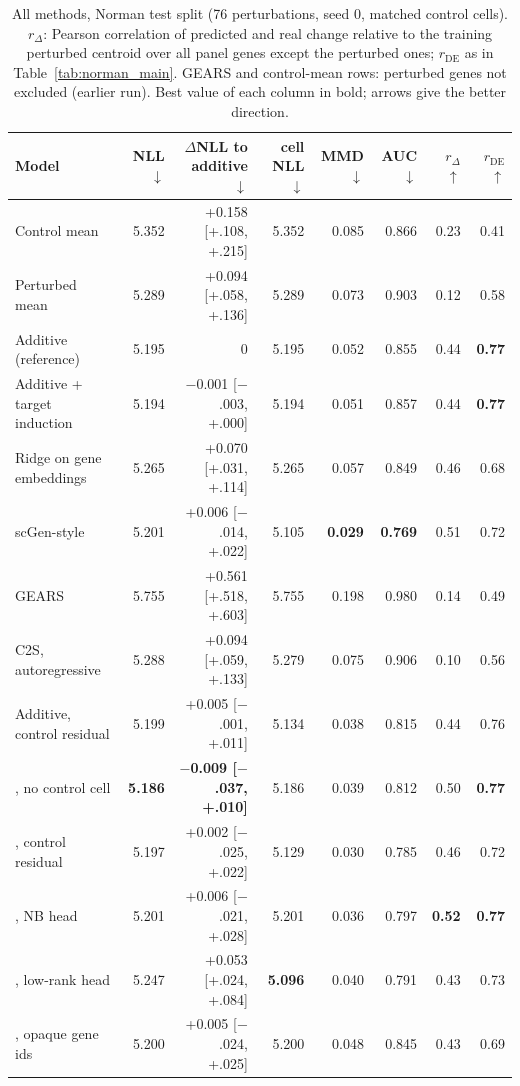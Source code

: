 \begin{table}[!htb]
\centering
\small
\setlength{\tabcolsep}{3pt}
\begin{tabular}{lrrrrrrr}
\toprule
Model & NLL $\downarrow$ & $\Delta$NLL to additive $\downarrow$ & cell NLL $\downarrow$ & MMD $\downarrow$ & AUC $\downarrow$ & $r_\Delta$ $\uparrow$ & $r_{\mathrm{DE}}$ $\uparrow$ \\
\midrule
Control mean & 5.352 & +0.158 [+.108, +.215] & 5.352 & 0.085 & 0.866 & 0.23 & 0.41 \\
Perturbed mean & 5.289 & +0.094 [+.058, +.136] & 5.289 & 0.073 & 0.903 & 0.12 & 0.58 \\
Additive (reference) & 5.195 & 0 & 5.195 & 0.052 & 0.855 & 0.44 & \textbf{0.77} \\
Additive + target induction & 5.194 & $-$0.001 [$-$.003, +.000] & 5.194 & 0.051 & 0.857 & 0.44 & \textbf{0.77} \\
Ridge on gene embeddings & 5.265 & +0.070 [+.031, +.114] & 5.265 & 0.057 & 0.849 & 0.46 & 0.68 \\
scGen-style & 5.201 & +0.006 [$-$.014, +.022] & 5.105 & \textbf{0.029} & \textbf{0.769} & 0.51 & 0.72 \\
GEARS & 5.755 & +0.561 [+.518, +.603] & 5.755 & 0.198 & 0.980 & 0.14 & 0.49 \\
C2S, autoregressive & 5.288 & +0.094 [+.059, +.133] & 5.279 & 0.075 & 0.906 & 0.10 & 0.56 \\
Additive, control residual & 5.199 & +0.005 [$-$.001, +.011] & 5.134 & 0.038 & 0.815 & 0.44 & 0.76 \\
\rowcolor{ours}\cad{}, no control cell & \textbf{5.186} & \textbf{$-$0.009 [$-$.037, +.010]} & 5.186 & 0.039 & 0.812 & 0.50 & \textbf{0.77} \\
\rowcolor{ours}\cad{}, control residual & 5.197 & +0.002 [$-$.025, +.022] & 5.129 & 0.030 & 0.785 & 0.46 & 0.72 \\
\rowcolor{ours}\cad{}, NB head & 5.201 & +0.006 [$-$.021, +.028] & 5.201 & 0.036 & 0.797 & \textbf{0.52} & \textbf{0.77} \\
\rowcolor{ours}\cad{}, low-rank head & 5.247 & +0.053 [+.024, +.084] & \textbf{5.096} & 0.040 & 0.791 & 0.43 & 0.73 \\
\rowcolor{ours}\cad{}, opaque gene ids & 5.200 & +0.005 [$-$.024, +.025] & 5.200 & 0.048 & 0.845 & 0.43 & 0.69 \\
\bottomrule
\end{tabular}
\caption{All methods, Norman test split (76 perturbations, seed 0, matched control cells). $r_\Delta$: Pearson correlation of predicted and real change relative to the training perturbed centroid over all panel genes except the perturbed ones; $r_{\mathrm{DE}}$ as in Table~\ref{tab:norman_main}. GEARS and control-mean rows: perturbed genes not excluded (earlier run). Best value of each column in bold; arrows give the better direction.}
\label{tab:norman_full}
\end{table}
